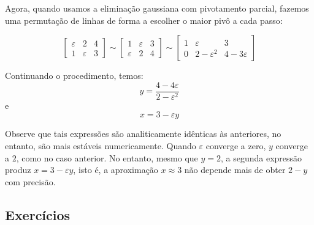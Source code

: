 \begin{ex}
Agora, quando usamos a eliminação gaussiana com pivotamento parcial, fazemos uma permutação de linhas de forma a escolher o maior pivô a cada passo:

$$\left[\begin{array}{cc|c}
\varepsilon & 2 & 4\\
1 & \varepsilon & 3
\end{array}
\right]\sim
\left[\begin{array}{cc|c}
1 & \varepsilon & 3\\
\varepsilon & 2 & 4
\end{array}
\right]\sim
\left[\begin{array}{cc|c}
1 & \varepsilon & 3\\
0 & 2-\varepsilon^2 & 4-3\varepsilon
\end{array}
\right]
$$

Continuando o procedimento, temos:
$$y=\frac{4-4\varepsilon}{2-\varepsilon^2}$$ e
$$x=3-\varepsilon y$$
\end{ex}

Observe que tais expressões são analiticamente idênticas às anteriores, no entanto, são mais estáveis numericamente. Quando $\varepsilon$ converge a zero, $y$ converge a $2$, como no caso anterior. No entanto, mesmo que $y=2$, a segunda expressão produz $x=3-\varepsilon y$, isto é, a aproximação $x\approx 3$ não depende mais de obter $2-y$ com precisão.

\subsection*{Exercícios}

